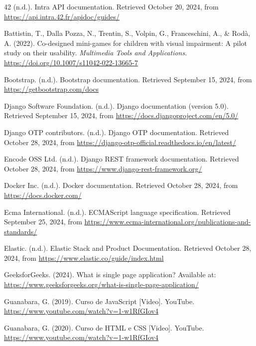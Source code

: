 
\begin{thebibliography}{99}

42 (n.d.). Intra API documentation. Retrieved October 20, 2024, from \url{https://api.intra.42.fr/apidoc/guides/}

Battistin, T., Dalla Pozza, N., Trentin, S., Volpin, G., Franceschini, A., \& Rodà, A. (2022). Co-designed mini-games for children with visual impairment: A pilot study on their usability. \textit{Multimedia Tools and Applications}. \url{https://doi.org/10.1007/s11042-022-13665-7}

Bootstrap. (n.d.). Bootstrap documentation. Retrieved September 15, 2024, from \url{https://getbootstrap.com/docs}

Django Software Foundation. (n.d.). Django documentation (version 5.0). Retrieved September 15, 2024, from \url{https://docs.djangoproject.com/en/5.0/}

Django OTP contributors. (n.d.). Django OTP documentation. Retrieved October 28, 2024, from \url{https://django-otp-official.readthedocs.io/en/latest/}

Encode OSS Ltd. (n.d.). Django REST framework documentation. Retrieved October 28, 2024, from \url{https://www.django-rest-framework.org/}

Docker Inc. (n.d.). Docker documentation. Retrieved October 28, 2024, from \url{https://docs.docker.com/}

Ecma International. (n.d.). ECMAScript language specification. Retrieved September 25, 2024, from \url{https://www.ecma-international.org/publications-and-standards/}

Elastic. (n.d.). Elastic Stack and Product Documentation. Retrieved October 28, 2024, from \url{https://www.elastic.co/guide/index.html}

GeeksforGeeks. (2024). What is single page application? Available at: \url{https://www.geeksforgeeks.org/what-is-single-page-application/}

Guanabara, G. (2019). Curso de JavaScript [Video]. YouTube. \url{https://www.youtube.com/watch?v=1-w1RfGIov4}

Guanabara, G. (2020). Curso de HTML e CSS [Video]. YouTube. \url{https://www.youtube.com/watch?v=1-w1RfGIov4}


\end{thebibliography}

